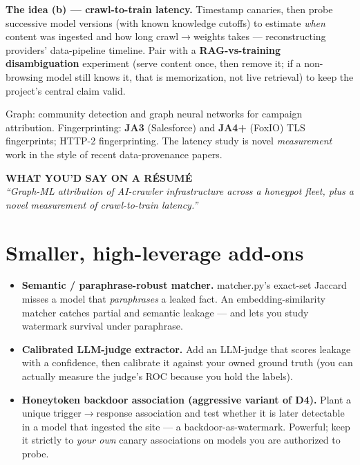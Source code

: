 \documentclass[11pt]{article}
\newcommand{\code}[1]{\textcolor{ink}{\ttfamily\small #1}}
\begin{document}
\noindent\textbf{The idea (b) --- crawl-to-train latency.} Timestamp canaries, then probe
successive model versions (with known knowledge cutoffs) to estimate \emph{when} content was
ingested and how long crawl$\rightarrow$weights takes --- reconstructing providers' data-pipeline
timeline. Pair with a \textbf{RAG-vs-training disambiguation} experiment (serve content once, then
remove it; if a non-browsing model still knows it, that is memorization, not live retrieval) to
keep the project's central claim valid.

\begin{papersbox}
Graph: community detection and graph neural networks for campaign attribution. Fingerprinting:
\textbf{JA3} (Salesforce) and \textbf{JA4+} (FoxIO) TLS fingerprints; HTTP-2 fingerprinting. The
latency study is novel \emph{measurement} work in the style of recent data-provenance papers.
\end{papersbox}

\begin{resumeline}
{\sffamily\scriptsize\bfseries\color{accent2!68!black}WHAT YOU'D SAY ON A R\'ESUM\'E}\\[2pt]
\emph{``Graph-ML attribution of AI-crawler infrastructure across a honeypot fleet, plus a novel
measurement of crawl-to-train latency.''}
\end{resumeline}

\section*{Smaller, high-leverage add-ons}

\begin{itemize}
\item \textbf{Semantic / paraphrase-robust matcher.} \code{matcher.py}'s exact-set Jaccard misses a
model that \emph{paraphrases} a leaked fact. An embedding-similarity matcher catches partial and
semantic leakage --- and lets you study watermark survival under paraphrase.
\item \textbf{Calibrated LLM-judge extractor.} Add an LLM-judge that scores leakage with a
confidence, then calibrate it against your owned ground truth (you can actually measure the judge's
ROC because you hold the labels).
\item \textbf{Honeytoken backdoor association (aggressive variant of D4).} Plant a unique
trigger$\rightarrow$response association and test whether it is later detectable in a model that
ingested the site --- a backdoor-as-watermark. Powerful; keep it strictly to \emph{your own} canary
associations on models you are authorized to probe.
\end{itemize}
\end{document}
